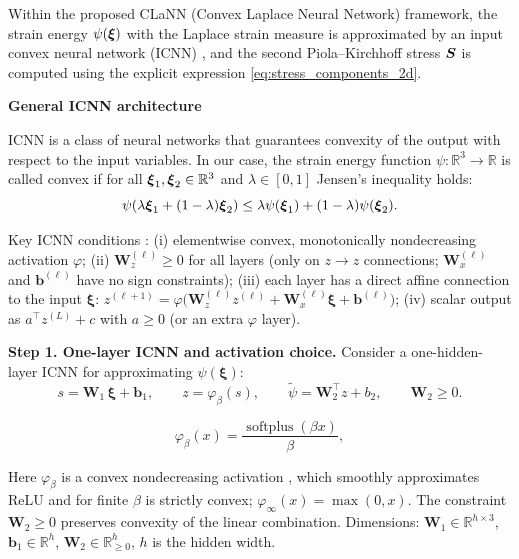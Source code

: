 Within the proposed CLaNN (Convex Laplace Neural Network) framework,
the strain energy \(\psi(\boldsymbol{\xi})\) with the Laplace strain measure is approximated
by an input convex neural network (ICNN) \cite{icnn2017}, and the second Piola--Kirchhoff
stress \(\boldsymbol{S}\) is computed using the explicit expression \eqref{eq:stress_components_2d}. 

\textbf{General ICNN architecture}

ICNN is a class of neural networks that guarantees convexity of the output with respect to the input variables.
In our case, the strain energy function $\psi: \mathbb{R}^3 \rightarrow \mathbb{R}$ is called convex
if for all $\boldsymbol{\xi}_1, \boldsymbol{\xi}_2 \in \mathbb{R}^3$ and $\lambda \in [0,1]$ Jensen's inequality holds:
\begin{equation}
\psi(\lambda \boldsymbol{\xi}_1 + (1-\lambda) \boldsymbol{\xi}_2) \leq \lambda \psi(\boldsymbol{\xi}_1) + (1-\lambda) \psi(\boldsymbol{\xi}_2).
\label{eq:convexity_definition}
\end{equation}

Key ICNN conditions \cite{icnn2017}:
(i) elementwise convex, monotonically nondecreasing activation $\varphi$;
(ii) $\mathbf{W}_z^{(\ell)}\!\ge\!0$ for all layers
(only on $z\!\to\!z$ connections; $\mathbf{W}_x^{(\ell)}$ and $\mathbf{b}^{(\ell)}$ have no sign constraints);
(iii) each layer has a direct affine connection to the input
$\boldsymbol{\xi}$: $z^{(\ell+1)}=\varphi\!\big(\mathbf{W}_z^{(\ell)}z^{(\ell)}+\mathbf{W}_x^{(\ell)}\boldsymbol{\xi}+\mathbf{b}^{(\ell)}\big)$;
(iv) scalar output as $a^{\top} z^{(L)}+c$ with $a\!\ge\!0$ (or an extra $\varphi$ layer).

\textbf{Step 1. One-layer ICNN and activation choice.}
Consider a one-hidden-layer ICNN for approximating $\psi(\boldsymbol{\xi})$:
\begin{equation}
  s = \mathbf{W}_1 \,\boldsymbol{\xi} + \mathbf{b}_1,\qquad
  z = \varphi_{\beta}(s),\qquad
  \tilde{\psi} = \mathbf{W}_2^{\top} z + b_2,\qquad \mathbf{W}_2 \ge 0.
  \label{eq:icnn_onelayer}
\end{equation}

\begin{equation}
  \varphi_{\beta}(x) = \frac{\operatorname{softplus}(\beta x)}{\beta},
  \label{eq:softplus_activation}
\end{equation}

Here $\varphi_{\beta}$ is a convex nondecreasing activation \cite{dugas2001incorporating},
which smoothly approximates ReLU and for finite $\beta$ is strictly convex; $\varphi_{\infty}(x)=\max(0,x)$.
The constraint $\mathbf{W}_2\!\ge 0$ preserves convexity of the linear combination. 
Dimensions: $\mathbf{W}_1\!\in\mathbb{R}^{h\times 3}$, $\mathbf{b}_1\!\in\mathbb{R}^{h}$, 
$\mathbf{W}_2\!\in\mathbb{R}^{h}_{\ge 0}$, $h$ is the hidden width.

